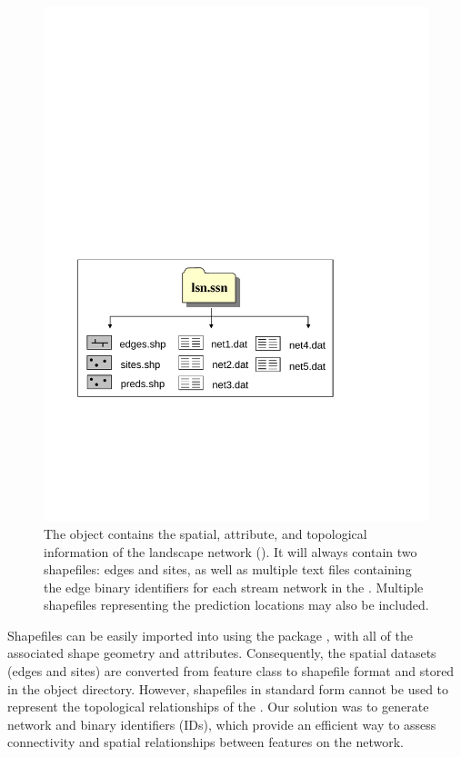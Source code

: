 \documentclass[article]{jss}
\begin{document}
\begin{figure}[htbp]
  \begin{center}
    \includegraphics[width=350pt,keepaspectratio]{Figures/Fig6.pdf}
  \end{center}
  \caption{The  object contains the spatial, attribute, and topological information of the landscape network (). It will always contain two shapefiles: edges and sites, as well as multiple text files containing the edge binary identifiers for each stream network in the . Multiple shapefiles representing the prediction locations may also be included.   \label{Fig6}}
\end{figure}

Shapefiles can be easily imported into  using the  package \citep{Biva:Pebe:Gome:appl:2008}, with all of the associated shape geometry and attributes. Consequently, the spatial datasets (edges and sites) are converted from \citet{ESRI:ArcG:2009} feature class to shapefile format and stored in the  object directory. However, shapefiles in standard form cannot be used to represent the topological relationships of the . Our solution was to generate network and binary identifiers (IDs), which provide an efficient way to assess connectivity and spatial relationships between features on the network.
\end{document}
